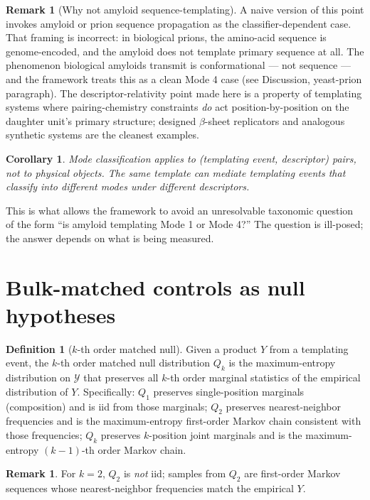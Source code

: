 \documentclass[11pt]{article}
\theoremstyle{plain}
\newtheorem{corollary}[theorem]{Corollary}
\theoremstyle{definition}
\newtheorem{definition}[theorem]{Definition}
\newtheorem{remark}[theorem]{Remark}
\begin{document}
\begin{remark}[Why not amyloid sequence-templating]
\label{rem:not_amyloid}
A naive version of this point invokes amyloid or prion sequence propagation as the classifier-dependent case. That framing is incorrect: in biological prions, the amino-acid sequence is genome-encoded, and the amyloid does not template primary sequence at all. The phenomenon biological amyloids transmit is conformational --- not sequence --- and the framework treats this as a clean Mode 4 case (see Discussion, yeast-prion paragraph). The descriptor-relativity point made here is a property of templating systems where pairing-chemistry constraints \emph{do} act position-by-position on the daughter unit's primary structure; designed $\beta$-sheet replicators and analogous synthetic systems are the cleanest examples.
\end{remark}

\begin{corollary}
Mode classification applies to (templating event, descriptor) pairs, not to physical objects. The same template can mediate templating events that classify into different modes under different descriptors.
\end{corollary}

This is what allows the framework to avoid an unresolvable taxonomic question of the form ``is amyloid templating Mode 1 or Mode 4?'' The question is ill-posed; the answer depends on what is being measured.


\section{Bulk-matched controls as null hypotheses}

\begin{definition}[$k$-th order matched null]
Given a product $Y$ from a templating event, the $k$-th order matched null distribution $Q_k$ is the maximum-entropy distribution on $\mathcal{Y}$ that preserves all $k$-th order marginal statistics of the empirical distribution of $Y$. Specifically: $Q_1$ preserves single-position marginals (composition) and is iid from those marginals; $Q_2$ preserves nearest-neighbor frequencies and is the maximum-entropy first-order Markov chain consistent with those frequencies; $Q_k$ preserves $k$-position joint marginals and is the maximum-entropy $(k-1)$-th order Markov chain.
\end{definition}

\begin{remark}
For $k = 2$, $Q_2$ is \emph{not} iid; samples from $Q_2$ are first-order Markov sequences whose nearest-neighbor frequencies match the empirical $Y$.
\end{remark}
\end{document}
